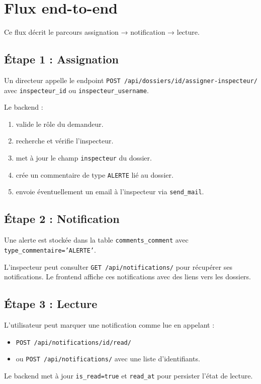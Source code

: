 \documentclass[12pt,a4paper]{article}
\begin{document}
\section{Flux end-to-end}
Ce flux décrit le parcours assignation → notification → lecture.

\subsection{Étape 1 : Assignation}
Un directeur appelle le endpoint \texttt{POST /api/dossiers/{id}/assigner-inspecteur/} avec \texttt{inspecteur_id} ou \texttt{inspecteur_username}.

Le backend :
\begin{enumerate}
    \item valide le rôle du demandeur.
    \item recherche et vérifie l’inspecteur.
    \item met à jour le champ \texttt{inspecteur} du dossier.
    \item crée un commentaire de type \texttt{ALERTE} lié au dossier.
    \item envoie éventuellement un email à l’inspecteur via \texttt{send_mail}.
\end{enumerate}

\subsection{Étape 2 : Notification}
Une alerte est stockée dans la table \texttt{comments_comment} avec \texttt{type_commentaire='ALERTE'}.

L’inspecteur peut consulter
\texttt{GET /api/notifications/} pour récupérer ses notifications. Le frontend affiche ces notifications avec des liens vers les dossiers.

\subsection{Étape 3 : Lecture}
L’utilisateur peut marquer une notification comme lue en appelant :
\begin{itemize}
    \item \texttt{POST /api/notifications/{id}/read/}
    \item ou \texttt{POST /api/notifications/} avec une liste d’identifiants.
\end{itemize}

Le backend met à jour \texttt{is_read=true} et \texttt{read_at} pour persister l’état de lecture.
\end{document}
